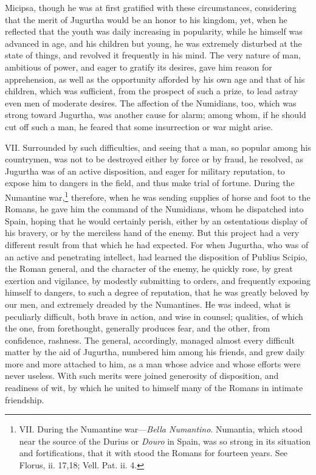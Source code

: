 Micipsa, though he was at first gratified with these circumstances,
considering that the merit of Jugurtha would be an honor to his
kingdom, yet, when he reflected that the youth was daily increasing in
popularity, while he himself was advanced in age, and his children but
young, he was extremely disturbed at the state of things, and revolved
it frequently in his mind. The very nature of man, ambitious of power,
and eager to gratify its desires, gave him reason for apprehension, as
well as the opportunity afforded by his own age and that of his children,
which was sufficient, from the prospect of such a prize, to lead astray
even men of moderate desires. The affection of the Numidians, too, which
was strong toward Jugurtha, was another cause for alarm; among whom, if
he should cut off such a man, he feared that some insurrection or war
might arise.

VII. Surrounded by such difficulties, and seeing that a man, so
popular among his countrymen, was not to be destroyed either by force
or by fraud, he resolved, as Jugurtha was of an active disposition,
and eager for military reputation, to expose him to dangers in the
field, and thus make trial of fortune. During the Numantine war,\footnote{VII. During the Numantine war—\emph{Bella Numantino}. Numantia,
which stood near the source of the Durius or \emph{Douro} in Spain, was
so strong in its situation and fortifications, that it with stood the
Romans for fourteen years. See Florus, ii. 17,18; Vell. Pat. ii. 4.}
therefore, when he was sending supplies of horse and foot to the
Romans, he gave him the command of the Numidians, whom he dispatched
into Spain, hoping that he would certainly perish, either by an
ostentatious display of his bravery, or by the merciless hand of the
enemy. But this project had a very different result from that which he
had expected. For when Jugurtha, who was of an active and penetrating
intellect, had learned the disposition of Publius Scipio, the Roman
general, and the character of the enemy, he quickly rose, by great
exertion and vigilance, by modestly submitting to orders, and frequently
exposing himself to dangers, to such a degree of reputation, that he was
greatly beloved by our men, and extremely dreaded by the Numantines. He
was indeed, what is peculiarly difficult, both brave in action, and wise
in counsel; qualities, of which the one, from forethought, generally
produces fear, and the other, from confidence, rashness. The general,
accordingly, managed almost every difficult matter by the aid of
Jugurtha, numbered him among his friends, and grew daily more and more
attached to him, as a man whose advice and whose efforts were never
useless. With such merits were joined generosity of disposition, and
readiness of wit, by which he united to himself many of the Romans in
intimate friendship.

